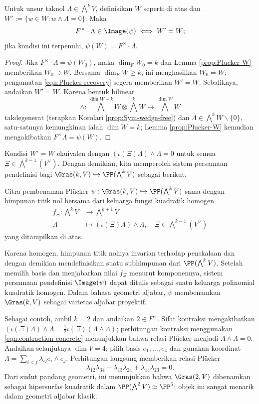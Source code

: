 \begin{lemma}
	Untuk unsur taknol $\Lambda \in \bigwedge^k V$, definisikan $W$ seperti di atas dan $W' := \{ w \in W: w \wedge \Lambda = 0 \}$. Maka
	\[ F^\times \cdot \Lambda \in \Image(\psi) \iff W'=W; \]
	jika kondisi ini terpenuhi, $\psi(W) = F^\times \cdot\Lambda$.
\end{lemma}
\begin{proof}
	Jika $F^\times \cdot \Lambda = \psi(W_0)$, maka $\dim_F W_0 = k$ dan Lemma \ref{prop:Plucker-W} memberikan $W_0 \supset W$. Bersama $\dim_F W \geq k$, ini menghasilkan $W_0=W$; pengamatan \eqref{eqn:Plucker-recovery} segera memberikan $W'=W$. Sebaliknya, andaikan $W'=W$. Karena bentuk bilinear
	\[ \wedge: \bigwedge^{\dim W - k} W \otimes \bigwedge^k W \to \bigwedge^{\dim W} W \]
takdegenerat (terapkan Korolari \ref{prop:Sym-wedge-free}) dan $\Lambda \in \bigwedge^k W \smallsetminus \{0\}$, satu-satunya kemungkinan ialah $\dim W = k$; Lemma \ref{prop:Plucker-W} kemudian mengakibatkan $F^\times\Lambda = \psi(W)$.
\end{proof}

Kondisi $W'=W$ ekuivalen dengan $(\iota(\Xi)\Lambda) \wedge \Lambda = 0$ untuk semua $\Xi \in \bigwedge^{k-1} (V^\vee)$. Dengan demikian, kita memperoleh sistem persamaan pendefinisi bagi $\Gras(k,V) \hookrightarrow \PP(\bigwedge^k V)$ sebagai berikut.
\begin{theorem}
	Citra pembenaman Plücker $\psi: \Gras(k,V) \hookrightarrow \PP(\bigwedge^k V)$ sama dengan himpunan titik nol bersama dari keluarga fungsi kuadratik homogen
	\begin{align*}
		f_\Xi: \bigwedge^k V & \longrightarrow \bigwedge^{k+1} V \\
		\Lambda & \longmapsto (\iota(\Xi)\Lambda) \wedge \Lambda, \quad \Xi \in \bigwedge^{k-1} (V^\vee)
	\end{align*}
	yang ditampilkan di atas.
\end{theorem}
Karena homogen, himpunan titik nolnya invarian terhadap penskalaan dan dengan demikian mendefinisikan suatu subhimpunan dari $\PP(\bigwedge^k V)$. Setelah memilih basis dan menjabarkan nilai $f_\Xi$ menurut komponennya, sistem persamaan pendefinisi $\Image(\psi)$ dapat ditulis sebagai suatu keluarga polinomial kuadratik homogen. Dalam bahasa geometri aljabar, $\psi$ membenamkan $\Gras(k,V)$ sebagai varietas aljabar proyektif.

Sebagai contoh, ambil $k=2$ dan andaikan $2 \in F^\times$. Sifat kontraksi mengakibatkan $(\iota(\Xi) \Lambda) \wedge \Lambda = \frac{1}{2} \iota(\Xi)(\Lambda \wedge \Lambda)$; perhitungan kontraksi menggunakan \eqref{eqn:contraction-concrete} menunjukkan bahwa relasi Plücker menjadi $\Lambda \wedge \Lambda = 0$. Andaikan selanjutnya $\dim V = 4$; pilih basis $e_1, \ldots, e_4$ dan gunakan koordinat $\Lambda = \sum_{i < j} \lambda_{ij} e_i \wedge e_j$. Perhitungan langsung memberikan relasi Plücker
\[ \lambda_{12}\lambda_{34} - \lambda_{13}\lambda_{24} + \lambda_{14}\lambda_{23} = 0. \]
Dari sudut pandang geometri, ini menunjukkan bahwa $\Gras(2, V)$ dibenamkan sebagai hipersurfas kuadratik dalam $\PP(\bigwedge^2 V) \simeq \PP^5$; objek ini sangat menarik dalam geometri aljabar klasik.

